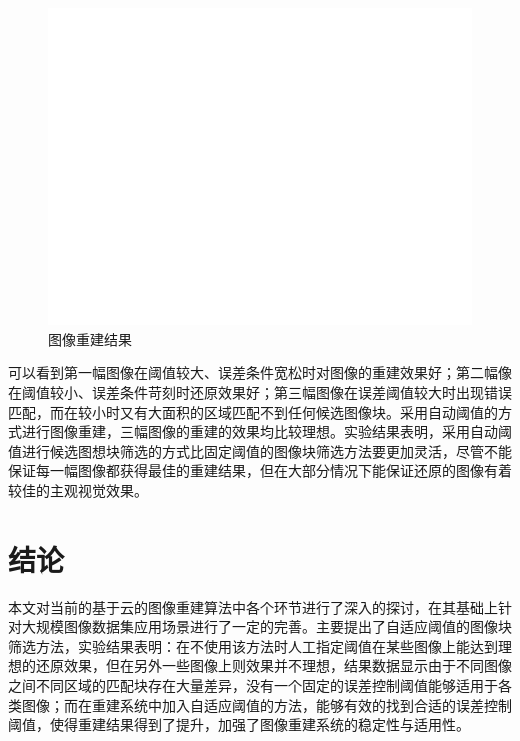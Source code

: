 \documentclass[UTF8]{csoarticle}
\begin{document}
\begin{figure}
\centering\includegraphics[width=15cm]{rec_result}
\caption{图像重建结果}
\label{fig:result}
\end{figure}

可以看到第一幅图像在阈值较大、误差条件宽松时对图像的重建效果好；第二幅像在阈值较小、误差条件苛刻时还原效果好；第三幅图像在误差阈值较大时出现错误匹配，而在较小时又有大面积的区域匹配不到任何候选图像块。采用自动阈值的方式进行图像重建，三幅图像的重建的效果均比较理想。实验结果表明，采用自动阈值进行候选图想块筛选的方式比固定阈值的图像块筛选方法要更加灵活，尽管不能保证每一幅图像都获得最佳的重建结果，但在大部分情况下能保证还原的图像有着较佳的主观视觉效果。

\section{结论}

本文对当前的基于云的图像重建算法中各个环节进行了深入的探讨，在其基础上针对大规模图像数据集应用场景进行了一定的完善。主要提出了自适应阈值的图像块筛选方法，实验结果表明：在不使用该方法时人工指定阈值在某些图像上能达到理想的还原效果，但在另外一些图像上则效果并不理想，结果数据显示由于不同图像之间不同区域的匹配块存在大量差异，没有一个固定的误差控制阈值能够适用于各类图像；而在重建系统中加入自适应阈值的方法，能够有效的找到合适的误差控制阈值，使得重建结果得到了提升，加强了图像重建系统的稳定性与适用性。
\end{document}
